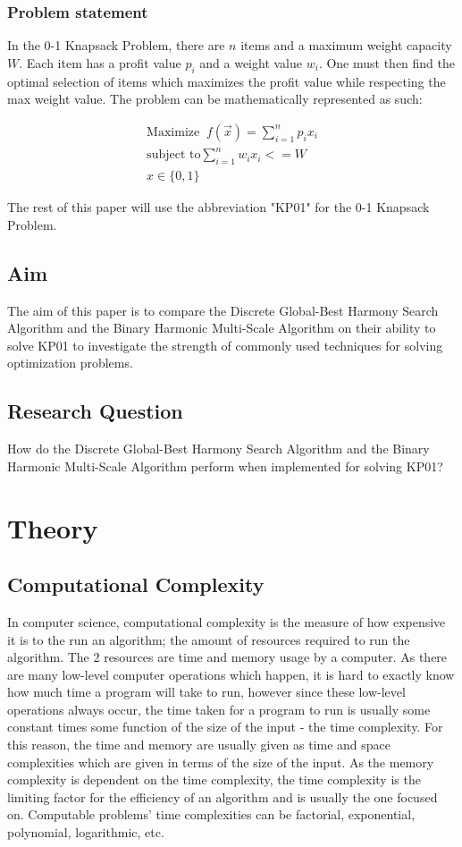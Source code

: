 \documentclass[titlepage]{article}
\begin{document}
\subsubsection*{Problem statement}
In the 0-1 Knapsack Problem, there are $n$ items and a maximum weight capacity $W$. Each item has a profit value $p_i$ and a weight value $w_i$. One must then find the optimal selection of items which maximizes the profit value while respecting the max weight value. The problem can be mathematically represented as such:

\vskip -0.5cm

\begin{gather}
    \text{Maximize}\;\; f(\Vec{x}) = \sum_{i = 1}^{n} p_i x_i \\
    \text{subject to} \sum_{i = 1}^{n} w_i x_i <= W \\
    x \in \{0, 1\}
\end{gather}

The rest of this paper will use the abbreviation "KP01" for the 0-1 Knapsack Problem. 

\subsection{Aim}
The aim of this paper is to compare the Discrete Global-Best Harmony Search Algorithm and the Binary Harmonic Multi-Scale Algorithm on their ability to solve KP01 to investigate the strength of commonly used techniques for solving optimization problems.

\subsection{Research Question}
How do the Discrete Global-Best Harmony Search Algorithm and the Binary Harmonic Multi-Scale Algorithm perform when implemented for solving KP01?

\newpage

\section{Theory}
\subsection{Computational Complexity}
In computer science, computational complexity is the measure of how expensive it is to the run an algorithm; the amount of resources required to run the algorithm. The 2 resources are time and memory usage by a computer. As there are many low-level computer operations which happen, it is hard to exactly know how much time a program will take to run, however since these low-level operations always occur, the time taken for a program to run is usually some constant times some function of the size of the input - the time complexity. For this reason, the time and memory are usually given as time and space complexities which are given in terms of the size of the input.  As the memory complexity is dependent on the time complexity, the time complexity is the limiting factor for the efficiency of an algorithm and is usually the one focused on. Computable problems' time complexities can be factorial, exponential, polynomial, logarithmic, etc.
\end{document}
